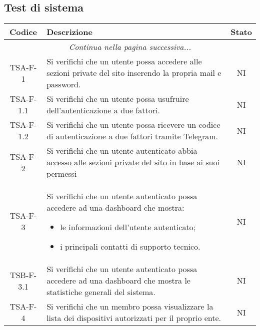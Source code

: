 	\subsection{Test di sistema}
		\begin{center}
			\begin{longtable}{|c|p{10cm}|c|}
			\hline
			\rowcolor{lighter-grayer}
			\textbf{Codice} & \textbf{Descrizione} & \textbf{Stato}  \\
			\hline
			\endhead
			\hline
	        \multicolumn{3}{|c|}{\textit{Continua nella pagina successiva...}}\\
	        \hline
	        \endfoot
	        \endlastfoot

			\hline
			 TSA-F-1 & Si verifichi che un utente possa accedere alle sezioni private del sito inserendo la propria mail e password.
			  & NI \\
			 \hline
			 TSA-F-1.1 & Si verifichi che un utente possa usufruire dell'autenticazione a due fattori. & NI \\
			 \hline
			 TSA-F-1.2 & Si verifichi che un utente possa ricevere un codice di autenticazione a due fattori tramite Telegram. & NI \\
			 \hline
			 TSA-F-2 & Si verifichi che un utente autenticato abbia accesso alle sezioni private del sito in base ai suoi permessi & NI \\
			 \hline
			 TSA-F-3 & Si verifichi che un utente autenticato possa accedere ad una dashboard che mostra:
			 \begin{itemize}
			 	\item le informazioni dell'utente autenticato;
			 	\item i principali contatti di supporto tecnico.
			 \end{itemize} & NI \\
			 \hline
			 TSB-F-3.1 & Si verifichi che un utente autenticato possa accedere ad una dashboard che mostra le statistiche generali del sistema. & NI \\
			 \hline
			 TSA-F-4 & Si verifichi che un membro possa visualizzare la lista dei dispositivi autorizzati per il proprio ente. & NI \\

\end{longtable}
\end{center}
